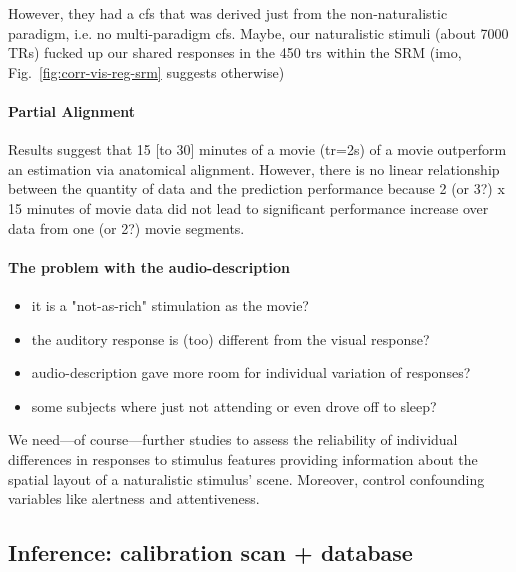 %
However, they had a \ac{cfs} that was derived just from the non-naturalistic
paradigm, i.e. no multi-paradigm \ac{cfs}.
%
Maybe, our naturalistic stimuli (about 7000 TRs) fucked up our shared responses
in the 450 \acp{tr} within the SRM (imo, Fig.~\ref{fig:corr-vis-reg-srm}
suggests otherwise)


\paragraph{Partial Alignment}


%
Results suggest that 15 [to 30] minutes of a movie (\ac{tr}=2s) of a movie
outperform an estimation via anatomical alignment.
%
However, there is no linear relationship between the quantity of data and the
prediction performance because 2 (or 3?) x 15 minutes of movie data did not lead
to significant performance increase over data from one (or 2?) movie segments.


\paragraph{The problem with the audio-description}

\begin{itemize}

    \item it is a "not-as-rich" stimulation as the movie?

    \item the auditory response is (too) different from the visual response?

    \item audio-description gave more room for individual variation of
        responses?

    \item some subjects where just not attending or even drove off to sleep?

\end{itemize}
%
We need---of course---further studies to assess the reliability of individual
differences in responses to stimulus features providing information about the
spatial layout of a naturalistic stimulus' scene.
%
Moreover, control confounding variables like alertness and attentiveness.


\subsection{Inference: calibration scan + database}


